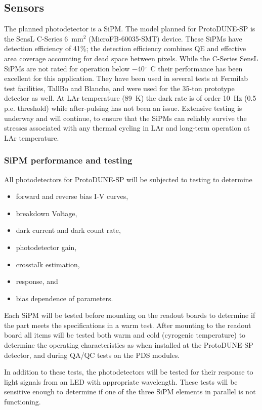 \subsection{Sensors}
The planned photodetector is a SiPM.  
The model planned for ProtoDUNE-SP is the SensL C-Series 6~mm$^2$
(MicroFB-60035-SMT) device. These SiPMs have detection efficiency of
41\%; the detection efficiency combines QE and effective area
  coverage accounting for dead space between pixels. While the
C-Series SensL SiPMs are not rated for operation below
$-$40$^{\circ}$~C their performance has been excellent for this
application. 
They have been used in several tests at Fermilab test facilities,
TallBo and Blanche, and were used for the 35-ton prototype detector
as well.  At LAr temperature (89~K) the dark rate is of order 10~Hz
(0.5 p.e. threshold) while after-pulsing has not been an
issue. Extensive testing is underway and will continue, to ensure 
that the SiPMs can reliably survive the stresses associated with 
any thermal cycling in LAr and long-term operation at LAr temperature.

\subsubsection{SiPM performance and testing}

All photodetectors for ProtoDUNE-SP will be subjected to testing to determine
\begin{itemize}
\item forward and reverse bias I-V curves,
\item breakdown Voltage,
\item dark current and dark count rate,
\item photodetector gain,
\item crosstalk estimation,
\item response, and
\item bias dependence of parameters.
\end{itemize}
Each SiPM will be tested before mounting on the readout boards to determine
if the part meets the specifications in a warm test.  After mounting to
the readout board all items will be tested both warm and cold (cyrogenic 
temperature) to determine the operating characteristics as when %
installed at the ProtoDUNE-SP detector, and during QA/QC tests on the PDS modules.

In addition to these tests, the photodetectors will be tested for their
response to light signals from an LED with appropriate wavelength.
These tests will be sensitive enough to determine if one of the three SiPM
elements in parallel is not functioning.


